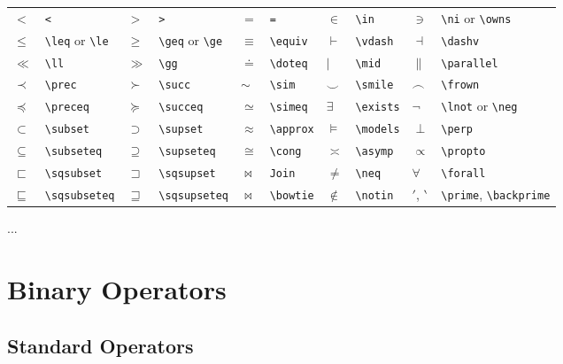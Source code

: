 \documentclass[10pt, english]{article}
\begin{document}
	\begin{center}
		\scriptsize
	\begin{tabular}{ll|ll|ll|ll|ll}
		$<$ & \verb|<| & $>$ & \verb|>| & $=$ & \verb|=| & $\in$ & \verb|\in| & $\ni$ & \verb|\ni| or \verb|\owns| \\
		$\le$ & \verb|\leq| or \verb|\le| & $\ge$ & \verb|\geq| or \verb|\ge| & $\equiv$ & \verb|\equiv| & $\vdash$ & \verb|\vdash| & $\dashv$ & \verb|\dashv| \\
		$\ll$ & \verb|\ll| & $\gg$ & \verb|\gg| & $\doteq$ & \verb|\doteq| & $\mid$ & \verb|\mid| & $\parallel$ & \verb|\parallel| \\
		$\prec$ & \verb|\prec| & $\succ$ & \verb|\succ| & $\sim$ & \verb|\sim| & $\smile$ & \verb|\smile| & $\frown$ & \verb|\frown| \\
		$\preceq$ & \verb|\preceq| & $\succeq$ & \verb|\succeq| & $\simeq$ & \verb|\simeq| & $\exists$ & \verb|\exists| & $\lnot$ & \verb|\lnot| or \verb|\neg| \\
		$\subset$ & \verb|\subset| & $\supset$ & \verb|\supset| & $\approx$ & \verb|\approx| & $\models$ & \verb|\models| & $\perp$ & \verb|\perp| \\
		$\subseteq$ & \verb|\subseteq| & $\supseteq$ & \verb|\supseteq| & $\cong$ & \verb|\cong| & $\asymp$ & \verb|\asymp| & $\propto$ & \verb|\propto| \\
		$\sqsubset$ & \verb|\sqsubset| & $\sqsupset$ & \verb|\sqsupset| & $\Join$ & \verb|Join| & $\neq$ & \verb|\neq| & $\forall$ & \verb|\forall| \\
		$\sqsubseteq$ & \verb|\sqsubseteq| & $\sqsupseteq$ & \verb|\sqsupseteq| & $\bowtie$ & \verb|\bowtie| & $\notin$ & \verb|\notin| & $\prime$, $\backprime$ & \verb|\prime|, \verb|\backprime| \\
	\end{tabular}
	\end{center}

	...

\section{Binary Operators}

	\subsection{Standard Operators}
\end{document}
